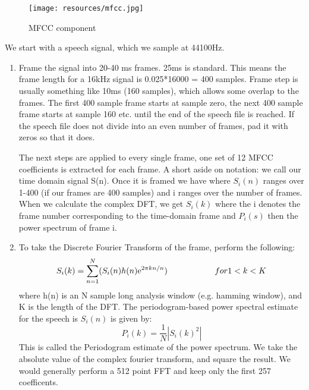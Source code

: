 \begin{figure}[h]
        \centering
        \texttt{[image: resources/mfcc.jpg]}
        \caption{MFCC component}
        \label{fig:figure4}
\end{figure}
We start with a speech signal, which we sample at 44100Hz.
\begin{enumerate}[1)]
        \item Frame the signal into 20-40 ms frames. 25ms is standard. This means the frame length for a 16kHz signal is 0.025*16000 = 400 samples. Frame step
                is usually something like 10ms (160 samples), which allows some overlap to the frames. The first 400 sample frame starts at sample zero, the
                next 400 sample frame starts at sample 160 etc. until the end of the speech file is reached. If the speech file does not divide into an even
                number of frames, pad it with zeros so that it does.
                \par The next steps are applied to every single frame, one set of 12 MFCC coefficients is extracted for each frame. A short aside on notation: we
                call our time domain signal S(n). Once it is framed we have where $S_i(n)$ ranges over 1-400 (if our frames are 400 samples) and i ranges over
                the number of frames. When we calculate the complex DFT, we get $S_i(k)$ where the i denotes the frame number corresponding to the time-domain frame and $P_i(s)$ then the power spectrum of frame i. 
        \item  To take the Discrete Fourier Transform of the frame, perform the following:
                \begin{equation}
                        S_i(k) = \sum_{n=1}^{N}(S_i(n)h(n)\mathrm{e}^{2\pi kn/n})    \hspace{20mm}for 1<k<K 
                \end{equation}
                where h(n) is an N sample long analysis window  (e.g. hamming window), and K is the length of the DFT.
                The periodogram-based power spectral estimate for the speech is $S_i(n)$ is given by: 
                \begin{equation}
                        P_i(k)=\frac{1}{N} |S_i(k)^2|
                \end{equation}
                This is called the Periodogram estimate of the power spectrum. We take the absolute value of the complex fourier transform, and square the result.
                We would generally perform a 512 point FFT and keep only the first 257 coefficents.

\end{enumerate}
